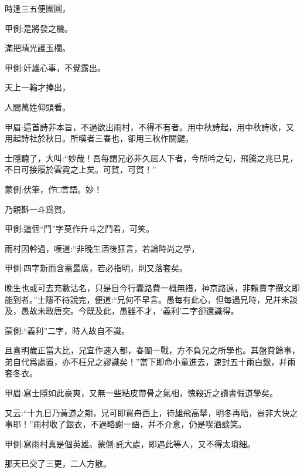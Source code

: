 \begin{poem}
    \begin{pl}時逢三五便團圓，\end{pl}\begin{note}甲側:是將發之機。\end{note}

    \begin{pl}滿把晴光護玉欄。\end{pl}\begin{note}甲側:奸雄心事，不覺露出。\end{note}

    \begin{pl}天上一輪才捧出，\end{pl}

    \begin{pl}人間萬姓仰頭看。\end{pl}\begin{note}甲眉:這首詩非本旨，不過欲出雨村，不得不有者。用中秋詩起，用中秋詩收，又用起詩社於秋日。所嘆者三春也，卻用三秋作關鍵。\end{note}
\end{poem}


\begin{parag}
    士隱聽了，大叫:“妙哉！吾每謂兄必非久居人下者，今所吟之句，飛騰之兆已見，不日可接履於雲霓之上矣。可賀，可賀！”\begin{note}蒙側:伏筆，作□言語。妙！\end{note}乃親斟一斗爲賀。\begin{note}甲側:這個“鬥”字莫作升斗之鬥看，可笑。\end{note}雨村因幹過，嘆道:“非晚生酒後狂言，若論時尚之學，\begin{note}甲側:四字新而含蓄最廣，若必指明，則又落套矣。\end{note}晚生也或可去充數沽名，只是目今行囊路費一概無措，神京路遠，非賴賣字撰文即能到者。”士隱不待說完，便道:“兄何不早言。愚每有此心，但每遇兄時，兄幷未談及，愚故未敢唐突。今既及此，愚雖不才，‘義利’二字卻還識得。\begin{note}蒙側:“義利”二字，時人故自不識。\end{note}且喜明歲正當大比，兄宜作速入都，春闈一戰，方不負兄之所學也。其盤費餘事，弟自代爲處置，亦不枉兄之謬識矣！”當下即命小童進去，速封五十兩白銀，幷兩套冬衣。\begin{note}甲眉:寫士隱如此豪爽，又無一些粘皮帶骨之氣相，愧殺近之讀書假道學矣。\end{note}又云:“十九日乃黃道之期，兄可即買舟西上，待雄飛高舉，明冬再晤，豈非大快之事耶！”雨村收了銀衣，不過略謝一語，幷不介意，仍是喫酒談笑。\begin{note}甲側:寫雨村真是個英雄。蒙側:託大處，即遇此等人，又不得太瑣細。\end{note}那天已交了三更，二人方散。
\end{parag}


